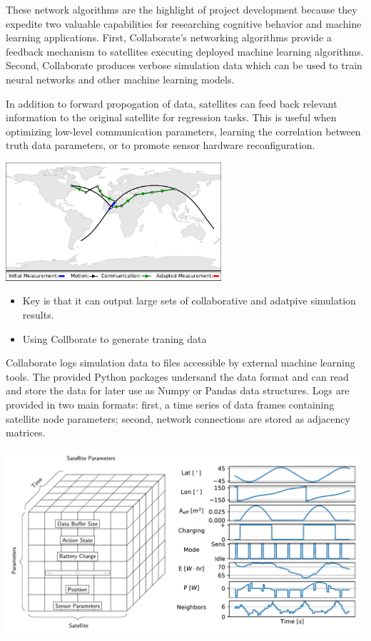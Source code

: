 \documentclass[11pt]{article}
\begin{document}
These network algorithms are the highlight of project development because they
expedite two valuable capabilities for researching cognitive behavior and
machine learning applications.  First, Collaborate's networking algorithms
provide a feedback mechanism to satellites executing deployed machine learning
algorithms.  Second, Collaborate produces verbose simulation data which can be
used to train neural networks and other machine learning models.

In addition to forward propogation of data, satellites can feed back relevant
information to the original satellite for regression tasks.  This is useful when
optimizing low-level communication parameters, learning the correlation between
truth data parameters, or to promote sensor hardware reconfiguration.

\begin{center}
\includegraphics[width=0.6\textwidth]{./images/loop.pdf}
\end{center}

\begin{itemize}
\item Key is that it can output large sets of collaborative and adatpive simulation
results.

\item Using Collborate to generate traning data
\end{itemize}

Collaborate logs simulation data to files accessible by external machine
learning tools.  The provided Python packages undersand the data format and can
read and store the data for later use as Numpy or Pandas data structures.  Logs
are provided in two main formats: first, a time series of data frames containing
satellite node parameters; second, network connections are stored as adjacency
matrices.

\begin{center}
\includegraphics[width=\textwidth]{./images/parameters_combined.pdf}
\end{center}
\end{document}
